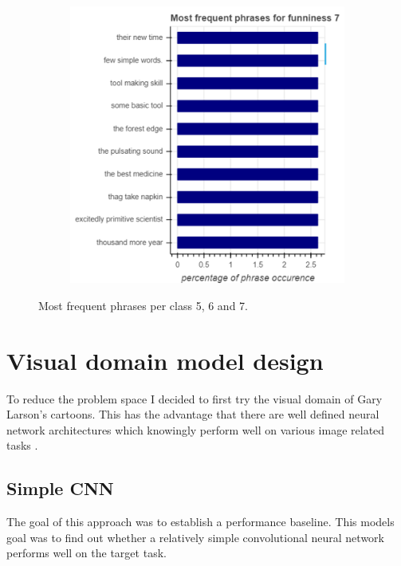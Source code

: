 \documentclass[draft,final,oneside]{vutinfth} %
\begin{document}
\begin{figure}
\begin{subfigure}[b]{0.45\textwidth}
\centering
\includegraphics[width=1.0\textwidth]{graphics/phrases/funniness_7}
\end{subfigure}

\caption{Most frequent phrases per class 5, 6 and 7.}
\label{fig:phraseocc2}

\end{figure}

\section{Visual domain model design}

To reduce the problem space I decided to first try the visual domain of Gary Larson's cartoons. This has the advantage that there are well defined neural network architectures which knowingly perform well on various image related tasks \cite{resnet}\cite{alexnet}.

\subsection{Simple CNN}

The goal of this approach was to establish a performance baseline. This models goal was to find out whether a relatively simple convolutional neural network performs well on the target task.
\end{document}

